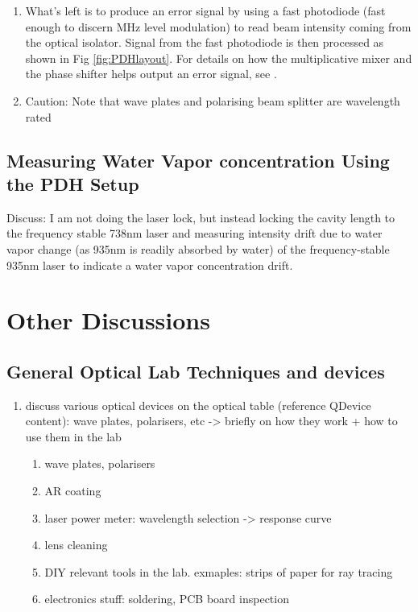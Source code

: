 \documentclass[11pt,A4Paper]{article}
\begin{document}
\begin{enumerate}
    \item What's left is to produce an error signal by using a fast photodiode (fast enough to discern MHz level modulation) to read beam intensity coming from the optical isolator. Signal from the fast photodiode is then processed as shown in Fig \ref{fig:PDHlayout}. For details on how the multiplicative mixer and the phase shifter helps output an error signal, see \cite{PDHintro}.

    \item Caution: Note that wave plates and polarising beam splitter are wavelength rated
\end{enumerate}


\subsection{Measuring Water Vapor concentration Using the PDH Setup}
Discuss: I am not doing the laser lock, but instead locking the cavity length to the frequency stable 738nm laser and measuring intensity drift due to water vapor change (as 935nm is readily absorbed by water) of the frequency-stable 935nm laser to indicate a water vapor concentration drift. 

\section{Other Discussions}
\subsection{General Optical Lab Techniques and devices}
\begin{enumerate}
    \item discuss various optical devices on the optical table (reference QDevice content): wave plates, polarisers, etc -> briefly on how they work + how to use them in the lab 
    \begin{enumerate}
        \item wave plates, polarisers
        \item AR coating
        \item laser power meter: wavelength selection -> response curve
        \item lens cleaning
        \item DIY relevant tools in the lab. exmaples: strips of paper for ray tracing
        \item electronics stuff: soldering, PCB board inspection
        
    \end{enumerate}
\end{enumerate}
\end{document}
